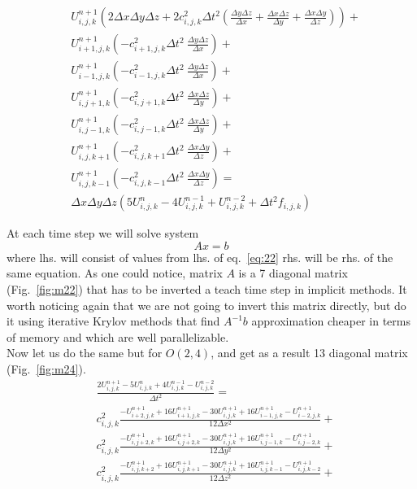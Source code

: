 \documentclass[12pt,a4paper]{report}
\begin{document}
\begin{equation}
\begin{aligned}
& U^{n+1}_{i,j,k} \left(2 \Delta x \Delta y \Delta z + 2 c^2_{i,j,k} \Delta t^2 \left( \frac{\Delta y \Delta z}{\Delta x} + \frac{\Delta x \Delta z}{\Delta y}+ \frac{\Delta x \Delta y}{\Delta z}\right)\right) + \\
& U^{n+1}_{i+1,j,k}  \left( -c^2_{i+1,j,k} \Delta t^2\ \frac{\Delta y \Delta z}{\Delta x}\right) + \\
& U^{n+1}_{i-1,j,k}  \left( -c^2_{i-1,j,k} \Delta t^2\ \frac{\Delta y \Delta z}{\Delta x}\right) + \\
& U^{n+1}_{i,j+1,k}  \left( -c^2_{i,j+1,k} \Delta t^2\ \frac{\Delta x \Delta z}{\Delta y}\right) + \\
& U^{n+1}_{i,j-1,k}  \left( -c^2_{i,j-1,k} \Delta t^2\ \frac{\Delta x \Delta z}{\Delta y}\right) + \\
& U^{n+1}_{i,j,k+1}  \left( -c^2_{i,j,k+1} \Delta t^2\ \frac{\Delta x \Delta y}{\Delta z}\right) + \\
& U^{n+1}_{i,j,k-1}  \left( -c^2_{i,j,k-1} \Delta t^2\ \frac{\Delta x \Delta y}{\Delta z}\right) = \\
& \Delta x \Delta y \Delta z \left( 5 U^{n}_{i,j,k} - 4 U^{n-1}_{i,j,k} + U^{n-2}_{i,j,k} + \Delta t^2 f_{i,j,k} \right)
\end{aligned}
\label{eq:22}
\end{equation}

At each time step we will solve system
\begin{equation}
Ax=b
\end{equation}
where lhs. will consist of values from lhs. of eq.~\ref{eq:22} rhs. will be rhs. of the same equation. As one could notice, matrix $A$ is a 7 diagonal matrix (Fig.~\ref{fig:m22}) that has to be inverted a teach time step in implicit methods. It worth noticing again that we are not going to invert this matrix directly, but do it using iterative Krylov methods that find $A^{-1} b$ approximation cheaper in terms of memory and which are well parallelizable.\\

Now let us do the same but for $O\left(2,4\right)$, and get as a result 13 diagonal matrix (Fig.~\ref{fig:m24}).
\begin{equation}
\begin{aligned}
&\frac{2 U^{n+1}_{i,j,k} - 5 U^{n}_{i,j,k} + 4 U^{n-1}_{i,j,k} - U^{n-2}_{i,j,k}}{\Delta t^2} = \\
& c^2_{i,j,k} \frac{-U^{n+1}_{i+2,j,k} + 16 U^{n+1}_{i+1,j,k} - 30 U^{n+1}_{i,j,k} + 16 U^{n+1}_{i-1,j,k} - U^{n+1}_{i-2,j,k}}{12\Delta x^2} +\\
& c^2_{i,j,k} \frac{-U^{n+1}_{i,j+2,k} + 16 U^{n+1}_{i,j+2,k} - 30 U^{n+1}_{i,j,k} + 16 U^{n+1}_{i,j-1,k} - U^{n+1}_{i,j-2,k}}{12\Delta y^2} +\\
& c^2_{i,j,k} \frac{-U^{n+1}_{i,j,k+2} + 16 U^{n+1}_{i,j,k+1} - 30 U^{n+1}_{i,j,k} + 16 U^{n+1}_{i,j,k-1} - U^{n+1}_{i,j,k-2}}{12\Delta z^2} +\\
\end{aligned}
\end{equation}
\end{document}
